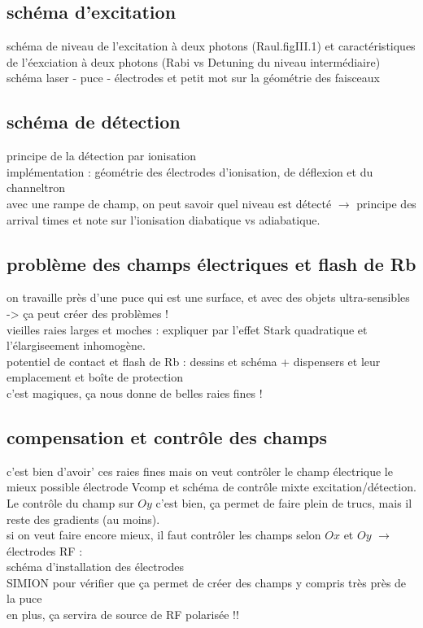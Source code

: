 	\subsection{schéma d'excitation}
		\noindent schéma de niveau de l'excitation à deux photons (Raul.figIII.1) et caractéristiques de l'éexciation à deux photons (Rabi vs Detuning du niveau intermédiaire) \\
		\noindent schéma laser - puce - électrodes et petit mot sur la géométrie des faisceaux
		
		
	\subsection{schéma de détection}
		\noindent principe de la détection par ionisation \\
		\noindent implémentation : géométrie des électrodes d'ionisation, de déflexion et du channeltron \\
		\noindent avec une rampe de champ, on peut savoir quel niveau est détecté $\rightarrow$ principe des arrival times et note sur l'ionisation diabatique vs adiabatique. 
		
	\subsection{problème des champs électriques et flash de Rb}
	on travaille près d'une puce qui est une surface, et avec des objets ultra-sensibles -> ça peut créer des problèmes ! \\
		\noindent vieilles raies larges et moches : expliquer par l'effet Stark quadratique et l'élargiseement inhomogène. \\
		\noindent potentiel de contact et flash de Rb : dessins et schéma + dispensers et leur emplacement et boîte de protection \\
		\noindent c'est magiques, ça nous donne de belles raies fines !
		
	\subsection{compensation et contrôle des champs}
	c'est bien d'avoir' ces raies fines mais on veut contrôler le champ électrique le mieux possible
		\noindent électrode Vcomp et schéma de contrôle mixte excitation/détection. Le contrôle du champ sur $Oy$ c'est bien, ça permet de faire plein de trucs, mais il reste des gradients (au moins).\\
		
		\noindent si on veut faire encore mieux, il faut contrôler les champs selon $Ox$ et $Oy$ $\rightarrow$ électrodes RF :
		\\ schéma d'installation des électrodes
		\\ SIMION pour vérifier que ça permet de créer des champs y compris très près de la puce
		\\ en plus, ça servira de source de RF polarisée !!
		
